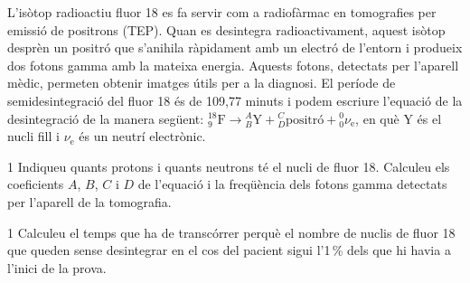 L'isòtop radioactiu fluor 18 es fa servir com a radiofàrmac en tomografies per emissió de positrons (TEP). Quan es desintegra radioactivament, aquest isòtop desprèn un positró que s'anihila ràpidament amb un electró de l'entorn i produeix dos fotons gamma amb la mateixa energia. Aquests fotons, detectats per l'aparell mèdic, permeten obtenir imatges útils per a la diagnosi. El període de semidesintegració del fluor 18 és de 109,77 minuts i podem escriure l'equació de la desintegració de la manera següent: ${}^{18}_{9}\mathrm{F} \rightarrow {}^{A}_{B}\mathrm{Y} + {}^{C}_{D}\text{positró} + {}^{0}_{0}\nu_\mathrm{e}$, en què Y és el nucli fill i $\nu_\mathrm{e}$ és un neutrí electrònic.


\begin{apartat}{1}
Indiqueu quants protons i quants neutrons té el nucli de fluor 18. Calculeu els coeficients $A$, $B$, $C$ i $D$ de l'equació i la freqüència dels fotons gamma detectats per l'aparell de la tomografia.
\end{apartat}

\begin{apartat}{1}
Calculeu el temps que ha de transcórrer perquè el nombre de nuclis de fluor 18 que queden sense desintegrar en el cos del pacient sigui l'1\,\% dels que hi havia a l'inici de la prova.
\end{apartat}

